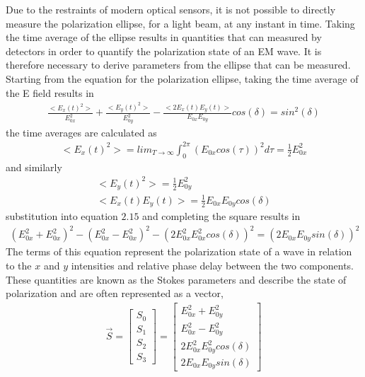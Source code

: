 Due to the restraints of modern optical sensors, it is not possible to directly measure the polarization ellipse, for a light beam, at any instant in time.  Taking the time average of the ellipse results in quantities that can measured by detectors in order to quantify the polarization state of an EM wave.  It is therefore necessary to derive parameters from the ellipse that can be measured.
Starting from the equation for the polarization ellipse, taking the time average of the E field results in
%
\begin{align}
    \frac{<E_x (t)^2>}{E_{0x}^2} + \frac{<E_y (t)^2>}{E_{0y}^2} - \frac{<2 E_x (t) E_y (t)>}{E_{0x} E_{0y} } cos(\delta)=sin^2 (\delta)
\end{align}
%
the time averages are calculated as
%
\begin{align}
    <E_x (t)^2> = lim_{T \rightarrow \infty} \int_{0}^{2\pi} (E_{0x} cos(\tau))^2  d\tau=\frac{1}{2} E_{0x}^2
\end{align}
%
and similarly
%
\begin{align}
    <E_y (t)^2>  = \frac{1}{2} E_{0y}^2 \\
	<E_x (t) E_y (t)>  =  \frac{1}{2} E_{0x} E_{0y} cos(\delta)
\end{align}
%
substitution into equation $2.15$ and completing the square results in
%
\begin{align}
    (E_{0x}^2+E_{0x}^2 )^2-(E_{0x}^2-E_{0x}^2 )^2-(2E_{0x}^2 E_{0x}^2  cos(\delta) )^2=(2E_{0x} E_{0y}  sin(\delta))^2
\end{align}
%
The terms of this equation represent the polarization state of a wave in relation to the $x$ and $y$ intensities and relative phase delay between the two components.
These quantities are known as the Stokes parameters and describe the state of polarization and are often represented as a vector,
%
\begin{align}
    \vec{S} =
    \begin{bmatrix}
        S_0 \\
        S_1 \\
        S_2 \\
        S_3
    \end{bmatrix}
    =
    \begin{bmatrix}
        E_{0x}^2+E_{0y}^2 \\
        E_{0x}^2-E_{0y}^2 \\
        2E_{0x}^2 E_{0y}^2 cos(\delta) \\
        2E_{0x} E_{0y}  sin(\delta)
    \end{bmatrix}
\end{align}
